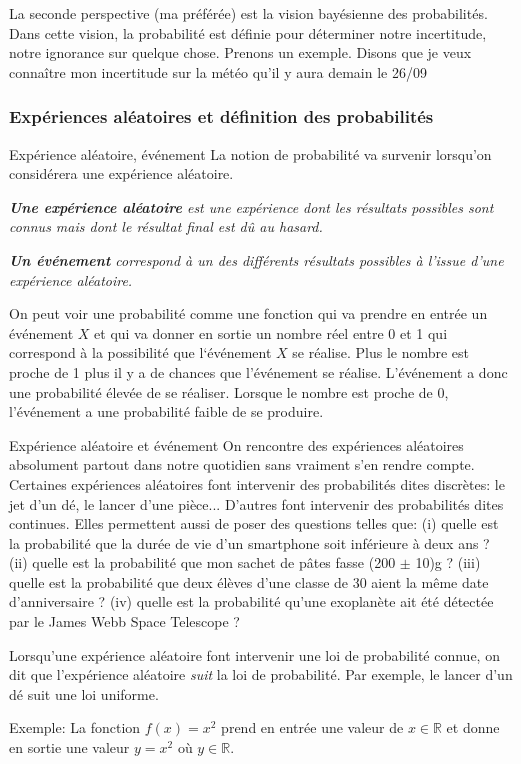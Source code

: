\documentclass[titlepage]{article}
\theoremstyle{cleanremark}
\begin{document}
La seconde perspective (ma préférée) est la vision bayésienne des probabilités. Dans cette vision, la probabilité est définie pour déterminer notre incertitude, notre ignorance sur quelque chose. 
Prenons un exemple. Disons que je veux connaître mon incertitude sur la météo qu'il y aura demain le 26/09 

\subsubsection{Expériences aléatoires et définition des probabilités}

\begin{definition}{Expérience aléatoire, événement}{}
    La notion de probabilité va survenir lorsqu'on considérera une expérience aléatoire.
    
    \textit{\textbf{Une expérience aléatoire} est une expérience dont les résultats possibles sont connus mais dont le résultat final est dû au hasard.}
    
    \textit{\textbf{Un événement} correspond à un des différents résultats possibles à l'issue d'une expérience aléatoire.} 


On peut voir une probabilité comme une fonction qui va prendre en entrée un événement $X$ et qui va donner en sortie un nombre réel entre 0 et 1 qui correspond à la possibilité que l`événement $X$ se réalise. Plus le nombre est proche de 1 plus il y a de chances que l'événement se réalise. L'événement a donc une probabilité élevée de se réaliser. Lorsque le nombre est proche de 0, l'événement a une probabilité faible de se produire.
\end{definition}

\begin{example}{Expérience aléatoire et événement}{}
    On rencontre des expériences aléatoires absolument partout dans notre quotidien sans vraiment s'en rendre compte.
    Certaines expériences aléatoires font intervenir des probabilités dites discrètes: le jet d'un dé, le lancer d'une pièce... 
    D'autres font intervenir des probabilités dites continues. Elles permettent aussi de poser des questions telles que: (i) quelle est la probabilité que la durée de vie d'un smartphone soit inférieure à deux ans ? (ii) quelle est la probabilité que mon sachet de pâtes fasse (200 $\pm$ 10)g ? (iii) quelle est la probabilité que deux élèves d'une classe de 30 aient la même date d'anniversaire ?
    (iv) quelle est la probabilité qu'une exoplanète ait été détectée par le James Webb Space Telescope ? 

    Lorsqu'une expérience aléatoire font intervenir une loi de probabilité connue, on dit que l'expérience aléatoire \textit{suit} la loi de probabilité. Par exemple, le lancer d'un dé suit une loi uniforme.
\end{example}
Exemple: La fonction $f(x)=x^2$ prend en entrée une valeur de $x\in \mathbb{R}$ et donne en sortie une valeur $y=x^2$ où $y\in \mathbb{R}$. 
\end{document}

